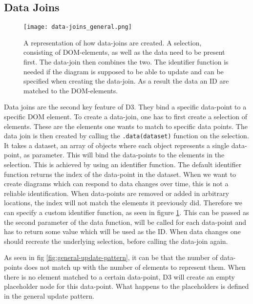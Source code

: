 \subsection{Data Joins}

\begin{figure}
    \texttt{[image: data-joins\_general.png]}
    \captionsetup{width=0.9\textwidth}
    \caption[data-joins]{A representation of how data-joins are created. A selection, consisting of DOM-elements, as well as the data need to be present first. The data-join then combines the two. The identifier function is needed if the diagram is supposed to be able to update and can be specified when creating the data-join. As a result the data an ID are matched to the DOM-elements.}
    \label{fig:data-joins}
\end{figure}

Data joins are the second key feature of D3. They bind a specific data-point to a specific DOM element. To create a data-join, one has to first create a selection of elements. These are the elements one wants to match to specific data points. The data join is then created by calling the \verb|.data(dataset)| function on the selection. It takes a dataset, an array of objects where each object represents a single data-point, as parameter. This will bind the data-points to the elements in the selection. This is achieved by using an identifier function. The default identifier function returns the index of the data-point in the dataset. When we want to create diagrams which can respond to data changes over time, this is not a reliable identification. When data-points are removed or added in arbitrary locations, the index will not match the elements it previously did. Therefore we can specify a custom identifier function, as seen in figure \ref{fig:data-joins}. This can be passed as the second parameter of the data function, will be called for each data-point and has to return some value which will be used as the ID. When data changes one should recreate the underlying selection, before calling the data-join again.

As seen in fig \ref{fig:general-update-pattern}, it can be that the number of data-points does not match up with the number of elements to represent them. When there is no element matched to a certain data-point, D3 will create an empty placeholder node for this data-point. What happens to the placeholders is defined in the general update pattern.



